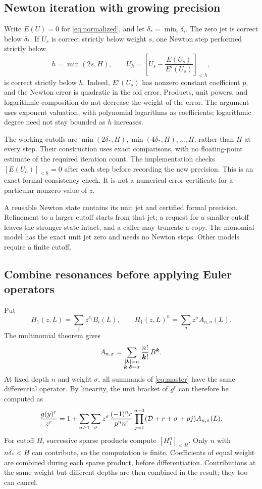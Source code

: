 \subsection{Newton iteration with growing precision}

Write $E(U)=0$ for \eqref{eq:normalized}, and let
$\delta_* = \min_i\delta_i$. The zero jet is correct below $\delta_*$.
If $U_s$ is correct strictly below weight $s$, one Newton step performed
strictly below
\[
 h=\min(2s,H),\qquad
 U_h=\left[U_s-\frac{E(U_s)}{E'(U_s)}\right]_{<h},
\]
is correct strictly below $h$. Indeed, $E'(U_s)$ has nonzero constant
coefficient $p$, and the Newton error is quadratic in the old error. Products,
unit powers, and logarithmic composition do not decrease the weight of the
error. The argument uses exponent valuation, with polynomial logarithms as
coefficients; logarithmic degree need not stay bounded as $h$ increases.

The working cutoffs are
$\min(2\delta_*,H),\min(4\delta_*,H),\ldots,H$, rather than $H$ at every
step. Their construction uses exact comparisons, with no floating-point
estimate of the required iteration count. The implementation checks
$[E(U_h)]_{<h}=0$ after each step before recording the new precision. This is
an exact formal consistency check. It is not a numerical error certificate
for a particular nonzero value of $z$.

A reusable Newton state contains its unit jet and certified formal precision.
Refinement to a larger cutoff starts from that jet; a request for a smaller
cutoff leaves the stronger state intact, and a caller may truncate a copy.
The monomial model has the exact unit jet zero and needs no Newton steps.
Other models require a finite cutoff.

\subsection{Combine resonances before applying Euler operators}

Put
\[
 H_1(z,L)=\sum_i z^{\delta_i}B_i(L),\qquad
 H_1(z,L)^n=\sum_\sigma z^\sigma A_{n,\sigma}(L).
\]
The multinomial theorem gives
\[
 A_{n,\sigma}=
 \sum_{\substack{|\boldsymbol k|=n\\\boldsymbol k\cdot\boldsymbol\delta=\sigma}}
 \frac{n!}{\boldsymbol k!}\,B^{\boldsymbol k}.
\]
At fixed depth $n$ and weight $\sigma$, all summands of
\eqref{eq:master} have the same differential operator. By linearity, the unit
bracket of $g^r$ can therefore be computed as
\begin{equation}
 \frac{g(y)^r}{z^r}
 =1+\sum_{n\ge1}\sum_\sigma z^\sigma
 \frac{(-1)^n r}{p^n n!}
 \prod_{j=1}^{n-1}(\mathcal D+r+\sigma+pj)A_{n,\sigma}(L).
 \label{eq:grouped-lagrange}
\end{equation}
For cutoff $H$, successive sparse products compute
$[H_1^n]_{<H}$. Only $n$ with $n\delta_*<H$ can contribute, so the computation
is finite. Coefficients of equal weight are combined during each sparse
product, before differentiation. Contributions at the same weight but
different depths are then combined in the result; they too can cancel.

